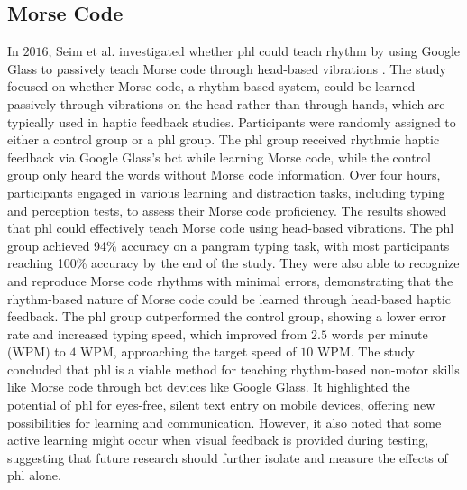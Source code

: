 \subsection{Morse Code}

In $2016$, Seim et al. investigated whether \gls{phl} could teach rhythm by using Google Glass to passively teach Morse code through head-based vibrations \cite{Seim2016a}. The study focused on whether Morse code, a rhythm-based system, could be learned passively through vibrations on the head rather than through hands, which are typically used in haptic feedback studies.
Participants were randomly assigned to either a control group or a \gls{phl} group. The \gls{phl} group received rhythmic haptic feedback via Google Glass's \gls{bct} while learning Morse code, while the control group only heard the words without Morse code information. Over four hours, participants engaged in various learning and distraction tasks, including typing and perception tests, to assess their Morse code proficiency.
The results showed that \gls{phl} could effectively teach Morse code using head-based vibrations. The \gls{phl} group achieved 94\% accuracy on a pangram typing task, with most participants reaching 100\% accuracy by the end of the study. They were also able to recognize and reproduce Morse code rhythms with minimal errors, demonstrating that the rhythm-based nature of Morse code could be learned through head-based haptic feedback. The \gls{phl} group outperformed the control group, showing a lower error rate and increased typing speed, which improved from $2.5$ words per minute (WPM) to $4$ WPM, approaching the target speed of $10$ WPM.
The study concluded that \gls{phl} is a viable method for teaching rhythm-based non-motor skills like Morse code through \gls{bct} devices like Google Glass. It highlighted the potential of \gls{phl} for eyes-free, silent text entry on mobile devices, offering new possibilities for learning and communication. However, it also noted that some active learning might occur when visual feedback is provided during testing, suggesting that future research should further isolate and measure the effects of \gls{phl} alone.


